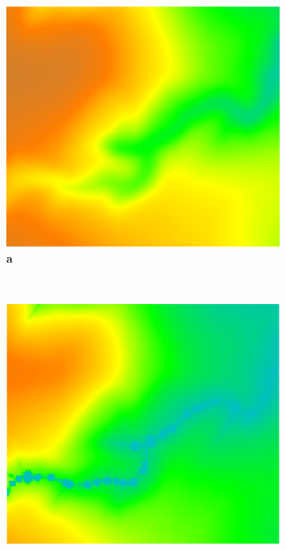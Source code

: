 \documentclass[final,3p,times,twocolumn]{elsarticle}
\begin{document}
\begin{figure}
\centering
%   
\begin{subfigure}[b]{0.3\textwidth}
\includegraphics[width=\textwidth]{images/lrwoods_elevation.png}
\label{fig_1_1}
\textbf{a} \\
\end{subfigure}
%
~ %
%
\begin{subfigure}[b]{0.3\textwidth}
\includegraphics[width=\textwidth]{images/lrwoods_dynamics_flux_5m_30m.png}

\end{subfigure}
\end{figure}
\end{document}
